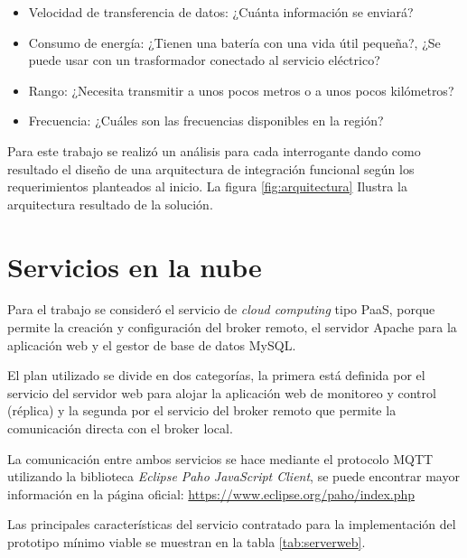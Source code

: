 \begin{itemize}
\item Velocidad de transferencia de datos: ¿Cuánta información se enviará?
\item Consumo de energía: ¿Tienen una batería con una vida útil pequeña?, ¿Se puede usar con un trasformador conectado al servicio eléctrico?
\item Rango: ¿Necesita transmitir a unos pocos metros o a unos pocos kilómetros?
\item Frecuencia: ¿Cuáles son las frecuencias disponibles en la región?
\end{itemize}

\vspace{0.5cm}

Para este trabajo se realizó un análisis para cada interrogante dando como resultado el diseño de una arquitectura de integración funcional según los requerimientos  planteados al inicio. La figura \ref{fig:arquitectura} Ilustra la arquitectura resultado de la solución.

\section{Servicios en la nube}

Para el trabajo se consideró el servicio de \emph{cloud computing} tipo PaaS, porque permite la creación y configuración del broker remoto, el servidor Apache para la aplicación web y el gestor de base de datos MySQL.

El plan utilizado se divide en dos categorías, la primera está definida por el servicio del servidor web para alojar la aplicación web de monitoreo y control (réplica) y la segunda por el servicio del broker remoto que permite la comunicación directa con el broker local. 

La comunicación entre ambos servicios se hace mediante el protocolo MQTT utilizando la biblioteca  \emph{Eclipse Paho JavaScript Client}, se puede encontrar mayor información en la página oficial: \url{https://www.eclipse.org/paho/index.php} 

Las principales características  del servicio contratado para la implementación del prototipo mínimo viable se muestran en la tabla \ref{tab:serverweb}.


